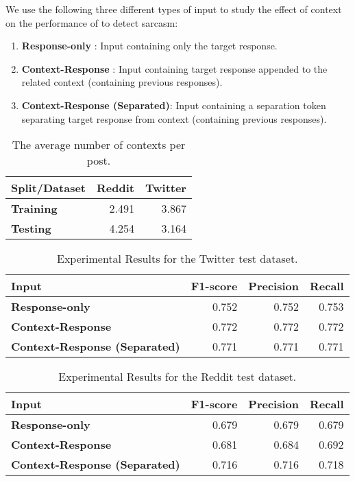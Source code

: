 \documentclass[11pt,a4paper]{article}
\begin{document}
We use the following three different types of input to study the effect of context on the performance of  to detect sarcasm:
\begin{enumerate}
\item \textbf{Response-only} : Input containing only the target response.
\item \textbf{Context-Response} : Input containing target response appended to the related context (containing previous responses).
\item \textbf{Context-Response (Separated)}: Input containing a separation token separating target response from context (containing previous responses).
\end{enumerate}

\begin{table}[!htbp]
\centering
\begin{tabular}{|l|r|r|}
\hline
\textbf{Split/Dataset} & \textbf{Reddit} & \textbf{Twitter} \\ \hline
\textbf{Training} & 2.491 & 3.867 \\ \hline
\textbf{Testing} & 4.254 & 3.164 \\ \hline
\end{tabular}
\caption{The average number of contexts per post.}
\label{tab:avg-context-len}
\end{table}

\begin{table*}[!htbp]
\centering
\begin{tabular}{|l|r|r|r|}
\hline
\textbf{Input} & \textbf{F1-score} & \textbf{Precision} & \textbf{Recall} \\ \hline
\textbf{Response-only} & 0.752 & 0.752 & 0.753 \\ \hline
\textbf{Context-Response} & 0.772 & 0.772 & 0.772 \\ \hline
\textbf{Context-Response (Separated)} & 0.771 & 0.771 & 0.771 \\ \hline
\end{tabular}
\caption{Experimental Results for the Twitter test dataset.
}
\label{tab:twitter-results}
\end{table*}

\begin{table*}[!htbp]
\centering
\begin{tabular}{|l|r|r|r|}
\hline
\textbf{Input} & \textbf{F1-score} & \textbf{Precision} & \textbf{Recall} \\ \hline
\textbf{Response-only} & 0.679 & 0.679 & 0.679 \\ \hline
\textbf{Context-Response} & 0.681 & 0.684 & 0.692 \\ \hline
\textbf{Context-Response (Separated)} & 0.716 & 0.716 & 0.718 \\ \hline
\end{tabular}
\caption{Experimental Results for the Reddit test dataset.}
\label{tab:reddit-results}
\end{table*}
\end{document}
